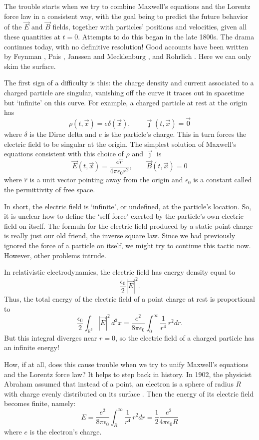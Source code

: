 \documentclass[12pt]{article}
\begin{document}
The trouble starts when we try to combine Maxwell's equations and the Lorentz force law in a consistent way, with the goal being to predict the future behavior of the $\vec{E}$ and $\vec{B}$ fields, together with particles' positions and velocities, given all these quantities at $t = 0$.  Attempts to do this began in the late 1800s.  The drama continues today, with no definitive resolution!   Good accounts have been written by Feynman \cite{Feynman}, Pais \cite{Pais}, Janssen and Mecklenburg \cite{JM}, and Rohrlich \cite{Rohrlich1997}.  Here we can only skim the surface.

The first sign of a difficulty is this: the charge density and current associated to a charged particle are singular, vanishing off the curve it traces out in spacetime but `infinite' on this curve.  For example, a charged particle at rest at the origin has
\[        \rho(t,\vec x) = e \delta(\vec{x}), \qquad \vec{\jmath}(t,\vec{x}) = \vec{0} \]
where $\delta$ is the Dirac delta and $e$ is the particle's charge.   
This in turn forces the electric field to be singular at the origin.  The simplest solution of Maxwell's equations consistent with this choice of $\rho$ and $\vec\jmath$ is
\[  \vec{E}(t,\vec x) = \frac{e \hat{r}}{4 \pi \epsilon_0 r^2}, \qquad 
     \vec{B}(t,\vec x) = 0 \]
where $\hat{r}$ is a unit vector pointing away from the origin and $\epsilon_0$ is a constant called the permittivity of free space.  

In short, the electric field is `infinite', or undefined, at the particle's location.  So, it is unclear how to define the `self-force' exerted by the particle's own electric field on itself.
The formula for the electric field produced by a static point charge is really just our old friend, the inverse square law.  Since we had previously ignored the force of a particle 
on itself, we might try to continue this tactic now.   However, other problems intrude.

In relativistic electrodynamics, the electric field has energy density equal to 
\[         \frac{\epsilon_0}{2} |\vec{E}|^2 .   \]
Thus, the total energy of the electric field of a point charge at rest is proportional to
\[  \displaystyle{ \frac{\epsilon_0}{2} \int_{\mathbb{R}^3} |\vec{E}|^2 \, d^3 x =
\frac{e^2}{8 \pi \epsilon_0} \int_0^\infty \frac{1}{r^4} \, r^2 dr. } \]
But this integral diverges near $r = 0$, so the electric field of a charged particle 
has an infinite energy!   

How, if at all, does this cause trouble when we try to unify Maxwell's equations and the Lorentz force law?  It helps to step back in history.  In 1902, the physicist Abraham assumed that instead of a point, an electron is a sphere of radius $R$ with charge evenly distributed on its surface \cite{Abraham1902}. Then the energy of its electric field becomes finite, namely:
\[  E = \frac{e^2}{8 \pi \epsilon_0} \int_{R}^\infty \frac{1}{r^4} \, r^2 dr 
= \frac{1}{2} \frac{e^2}{4 \pi \epsilon_0 R} \]
where $e$ is the electron's charge. 
\end{document}
